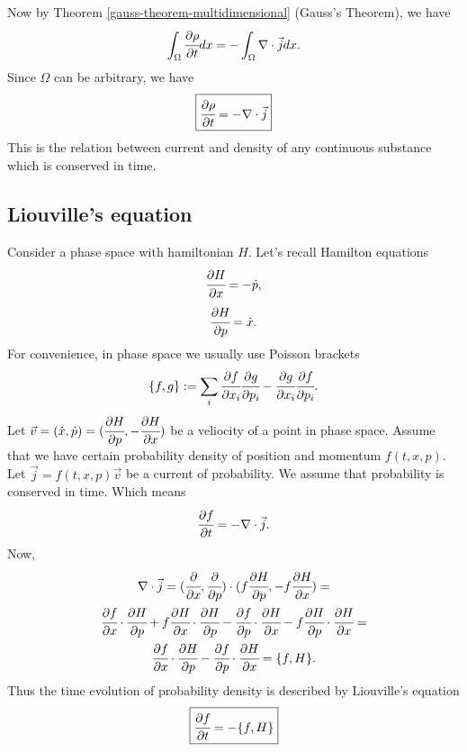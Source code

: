 \documentclass[main.tex]{subfiles}
\begin{document}
Now by Theorem \ref{gauss-theorem-multidimensional} (Gauss's Theorem), we have
\begin{equation}
\int_\Omega \cfrac{\partial \rho}{\partial t}dx = -\int_\Omega \nabla \cdot \vec{j}dx.
\end{equation}
Since $\Omega$ can be arbitrary, we have
\begin{equation}
\boxed{\cfrac{\partial \rho}{\partial t} = -\nabla \cdot \vec{j}}
\end{equation}
This is the relation between current and density of any continuous substance which is conserved in time.

\subsection{Liouville's equation}
\label{liouville-equation}
Consider a phase space with hamiltonian $H$. Let's recall Hamilton equations
\begin{equation}
\cfrac{\partial H}{\partial x} = -\dot{p},
\end{equation}
\begin{equation}
\cfrac{\partial H}{\partial p} = \dot{x}.
\end{equation}
For convenience, in phase space we usually use Poisson brackets
\begin{equation}
\{f, g\} := \sum_i \cfrac{\partial f}{\partial x_i}\cfrac{\partial g}{\partial p_i} - \cfrac{\partial g}{\partial x_i}\cfrac{\partial f}{\partial p_i}. 
\end{equation}
Let $\vec{v} = (\dot{x}, \dot{p}) = (\cfrac{\partial H}{\partial p}, -\cfrac{\partial H}{\partial x})$ be a veliocity of a point in phase space. Assume that we have certain probability density of position and momentum $f(t, x, p)$.
Let $\vec{j} = f(t, x, p) \vec{v}$ be a current of probability. We assume that probability is conserved in time. Which means
\begin{equation}
\cfrac{\partial f}{\partial t} = -\nabla \cdot \vec{j}.
\end{equation}
Now,
\begin{multline}
\nabla \cdot \vec{j} = (\cfrac{\partial}{\partial x}, \cfrac{\partial}{\partial p}) \cdot (f\cfrac{\partial H}{\partial p}, -f\cfrac{\partial H}{\partial x}) = \\
\cfrac{\partial f}{\partial x} \cdot\cfrac{\partial H}{\partial p} + f\cfrac{\partial H}{\partial x} \cdot \cfrac{\partial H}{\partial p} - \cfrac{\partial f}{\partial p} \cdot\cfrac{\partial H}{\partial x} - f\cfrac{\partial H}{\partial p} \cdot \cfrac{\partial H}{\partial x} = \\
\cfrac{\partial f}{\partial x} \cdot\cfrac{\partial H}{\partial p} - \cfrac{\partial f}{\partial p} \cdot\cfrac{\partial H}{\partial x} =
\{f, H\}.
\end{multline}
Thus the time evolution of probability density is described by Liouville's equation
\begin{equation}
\boxed{
\cfrac{\partial f}{\partial t} = - \{f, H\}
}
\end{equation}
\end{document}
